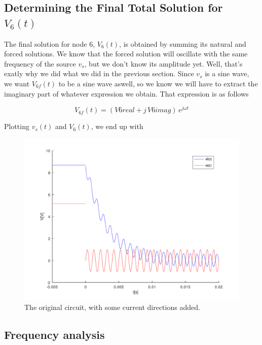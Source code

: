 \newpage
\subsection{Determining the Final Total Solution for $V_6(t)$}

The final solution for node 6, $V_6(t)$, is obtained by summing its natural and forced solutions. We know that the forced solution will oscillate with the same frequency of the source $v_s$, but we don't know its amplitude yet. Well, that's exatly why we did what we did in the previous section. Since $v_s$ is a sine wave, we want $V_{6f}(t)$ to be a sine wave aswell, so we know we will have to extract the imaginary part of whatever expression we obtain. That expression is as follows

\begin{center}
  \begin{equation}
    V_{6f}(t) = (V6real + j\,V6imag)\, e^{j\omega t}
  \end{equation} 
\end{center}

Plotting $v_s(t)$ and $V_6(t)$, we end up with

\begin{figure}[h] \centering
\includegraphics[width=0.6\linewidth]{../mat/t2-t5.pdf}
\caption{The original circuit, with some current directions added.}
\label{cfergter}
\end{figure}



\newpage

\subsection{Frequency analysis}


